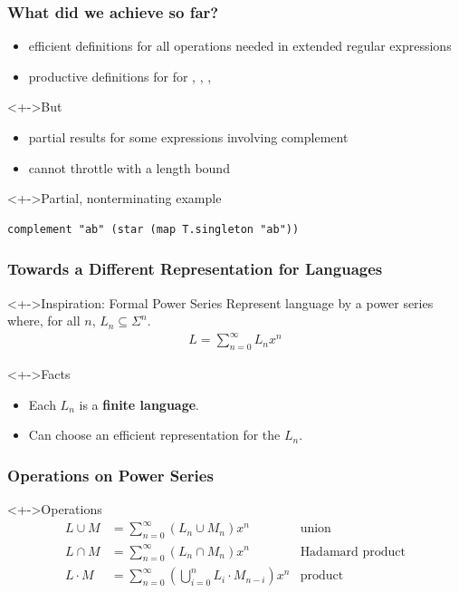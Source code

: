 \documentclass[pdftex]{beamer}
\begin{document}
\begin{frame}[fragile]
  \frametitle{What did we achieve so far?}
  \begin{itemize}
  \item<+-> efficient definitions for all operations needed in extended regular expressions
  \item<+-> productive definitions for for ,
    , , 
  \end{itemize}
  \begin{block}<+->{But}
    \begin{itemize}
    \item partial results for some expressions involving complement
    \item cannot throttle with a length bound
  \end{itemize}
  \end{block}
  \begin{exampleblock}<+->{Partial, nonterminating example}
\begin{lstlisting}[numbers=none]
complement "ab" (star (map T.singleton "ab"))
\end{lstlisting}
  \end{exampleblock}
\end{frame}
\begin{frame}
  \frametitle{Towards a Different Representation for Languages}
  \vspace{-\baselineskip}
  \begin{block}<+->{Inspiration: Formal Power Series}
    Represent language by a power series    where, for all $n$, $L_n \subseteq \Sigma^n$.
    \begin{gather*}
      L = \sum_{n=0}^\infty L_nx^n
    \end{gather*}
  \end{block}
  \begin{block}<+->{Facts}
    \begin{itemize}
    \item Each $L_n$ is a \textbf{finite language}.
    \item Can choose an efficient representation for the $L_n$.
    \end{itemize}
  \end{block}
\end{frame}
\begin{frame}
  \frametitle{Operations on Power Series}
\begin{block}<+->{Operations}
  \vspace{-\baselineskip}
    \begin{align*}
      L \cup M & = \sum_{n=0}^\infty (L_n \cup M_n)x^n & \text{union}\\
      L \cap M & = \sum_{n=0}^\infty (L_n \cap M_n)x^n & \text{Hadamard product} \\
      L \cdot M &= \sum_{n=0}^\infty (\bigcup_{i=0}^n L_i \cdot M_{n-i})x^n & \text{product}
    \end{align*}
  \end{block}
\end{frame}
\end{document}
